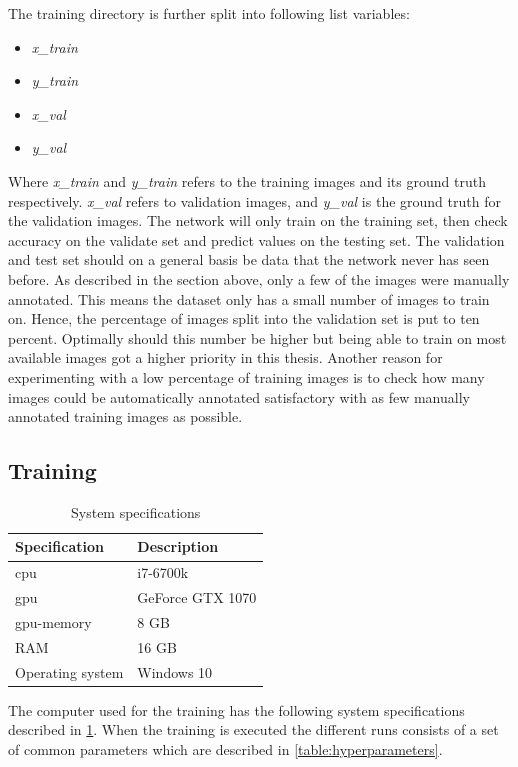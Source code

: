 \documentclass[USenglish]{ifimaster}  %
\begin{document}
The training directory is further split into following list variables:
\begin{itemize}
    \item \textit{x\_train}
    \item \textit{y\_train}
    \item \textit{x\_val}
    \item \textit{y\_val}
\end{itemize}
Where \textit{x\_train} and \textit{y\_train} refers to the training images and its ground truth respectively. \textit{x\_val} refers to validation images, and \textit{y\_val} is the ground truth for the validation images. The network will only train on the training set, then check accuracy on the validate set and predict values on the testing set. The validation and test set should on a general basis be data that the network never has seen before. As described in the section above, only a few of the images were manually annotated. This means the dataset only has a small number of images to train on. Hence, the percentage of images split into the validation set is put to ten percent. Optimally should this number be higher but being able to train on most available images got a higher priority in this thesis. Another reason for experimenting with a low percentage of training images is to check how many images could be automatically annotated satisfactory with as few manually annotated training images as possible.

\subsection{Training}

\begin{table}[ht]
\centering
\begin{tabular}{ll}
\hline
\textbf{Specification} & \textbf{Description} \\ \hline
\ac{cpu} & i7-6700k \\
\ac{gpu} & GeForce GTX 1070  \\
\ac{gpu}-memory & 8 GB  \\
RAM & 16 GB \\
Operating system & Windows 10  \\ \hline
\end{tabular}
\caption{System specifications}
\label{table:system_spec}
\end{table}

The computer used for the training has the following system specifications described in \cref{table:system_spec}.
When the training is executed the different runs consists of a set of common parameters which are described in \cref{table:hyperparameters}.
\end{document}
